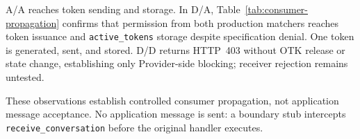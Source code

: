 A/A reaches token sending and storage. In D/A,
Table~\ref{tab:consumer-propagation} confirms that permission from both
production matchers reaches token issuance and \texttt{active\_tokens}
storage despite specification denial. One token is generated, sent, and stored.
D/D returns HTTP~403 without OTK release or state change, establishing only
Provider-side blocking; receiver rejection remains untested.

These observations establish controlled consumer propagation, not application
message acceptance. No application message is sent: a boundary stub intercepts
\texttt{receive\_conversation} before the original handler executes.
